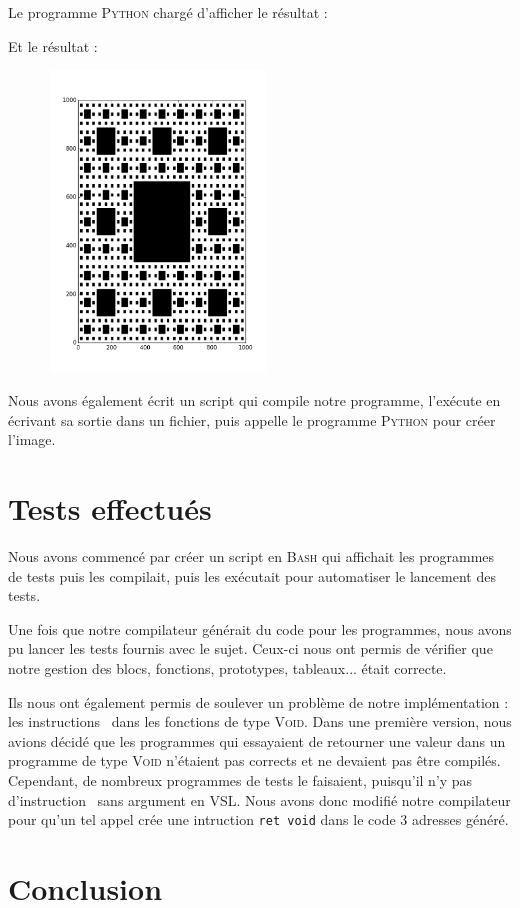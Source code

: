 \documentclass[french]{article}
\begin{document}
Le programme \textsc{Python} chargé d'afficher le résultat :


Et le résultat :

\begin{center}
\includegraphics[width=8cm, height=8cm]{../sierpinski.png}
\end{center}

Nous avons également écrit un script qui compile notre programme, l'exécute en écrivant sa sortie dans un fichier, puis appelle le programme \textsc{Python} pour créer l'image.

\section{Tests effectués}
Nous avons commencé par créer un script en \textsc{Bash} qui affichait les programmes de tests puis les compilait, puis les exécutait pour automatiser le lancement des tests.

Une fois que notre compilateur générait du code pour les programmes, nous avons pu lancer les tests fournis avec le sujet. Ceux-ci nous ont permis de vérifier que notre gestion des blocs, fonctions, prototypes, tableaux... était correcte.

Ils nous ont également permis de soulever un problème de notre implémentation : les instructions \return\ dans les fonctions de type \textsc{Void}. Dans une première version, nous avions décidé que les programmes qui essayaient de retourner une valeur dans un programme de type \textsc{Void} n'étaient pas corrects et ne devaient pas être compilés. Cependant, de nombreux programmes de tests le faisaient, puisqu'il n'y pas d'instruction \return\ sans argument en VSL. Nous avons donc modifié notre compilateur pour qu'un tel appel crée une intruction \texttt{ret void} dans le code 3 adresses généré.

\section{Conclusion}
\end{document}
